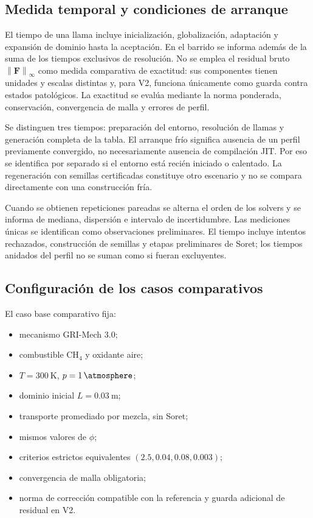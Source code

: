 \documentclass[12pt,a4paper,twoside,openany]{book}
\newcommand{\vect}[1]{\bm{#1}}
\newcommand{\norm}[1]{\left\lVert #1\right\rVert}
\begin{document}
\subsection{Medida temporal y condiciones de arranque}

El tiempo de una llama incluye inicialización, globalización, adaptación y
expansión de dominio hasta la aceptación. En el barrido se informa además de la
suma de los tiempos exclusivos de resolución. No se emplea el residual bruto
\(\norm{\vect F}_\infty\) como medida comparativa de exactitud: sus componentes
tienen unidades y escalas distintas y, para V2, funciona únicamente como guarda
contra estados patológicos. La exactitud se evalúa mediante la norma ponderada,
conservación, convergencia de malla y errores de perfil.

Se distinguen tres tiempos: preparación del entorno, resolución de llamas
y generación completa de la tabla. El arranque frío significa ausencia de un
perfil previamente convergido, no necesariamente ausencia de compilación JIT.
Por eso se identifica por separado si el entorno está recién iniciado o
calentado. La regeneración con semillas certificadas constituye otro escenario
y no se compara directamente con una construcción fría.

Cuando se obtienen repeticiones pareadas se alterna el orden de los solvers y
se informa de mediana, dispersión e intervalo de incertidumbre. Las mediciones
únicas se identifican como observaciones preliminares. El tiempo incluye
intentos rechazados, construcción de semillas y etapas preliminares de Soret;
los tiempos anidados del perfil no se suman como si fueran excluyentes.

\subsection{Configuración de los casos comparativos}

El caso base comparativo fija:

\begin{itemize}
  \item mecanismo GRI-Mech 3.0;
  \item combustible CH\(_4\) y oxidante aire;
  \item \(T=\SI{300}{\kelvin}\), \(p=\SI{1}{\atmosphere}\);
  \item dominio inicial \(L=\SI{0.03}{\metre}\);
  \item transporte promediado por mezcla, sin Soret;
  \item mismos valores de \(\phi\);
  \item criterios estrictos equivalentes \((2.5,0.04,0.08,0.003)\);
  \item convergencia de malla obligatoria;
  \item norma de corrección compatible con la referencia y guarda adicional
        de residual en V2.
\end{itemize}
\end{document}
